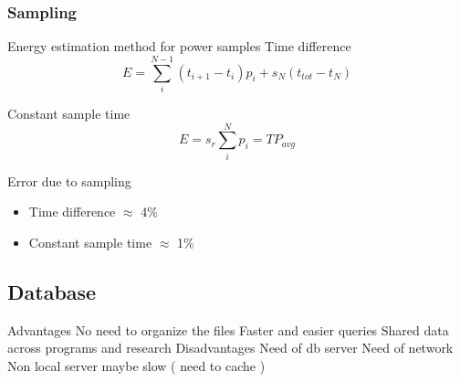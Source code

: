 
\subsubsection{Sampling}

Energy estimation method for power samples
Time difference
\begin{equation}
	E= \sum_i^{N-1}(t_{i+1}-t_i)p_i+s_N(t_{tot}-t_N)
\end{equation}

Constant sample time
\begin{equation}
E= s_r\sum_i^{N}p_i=TP_{avg}
\end{equation}

Error due to sampling
\begin{itemize}
	\item Time difference $\approx$ 4\%
	\item Constant sample time 	$\approx$ 1\%
\end{itemize}

\subsection{Database}

\begin{outline}
	\1 Advantages
		\2 No need to organize the files
		\2 Faster and easier queries
		\2 Shared data across programs and research
	\1 Disadvantages
		\2 Need of db server
		\2 Need of network
		\2 Non local server maybe slow ( need to cache )
\end{outline}
